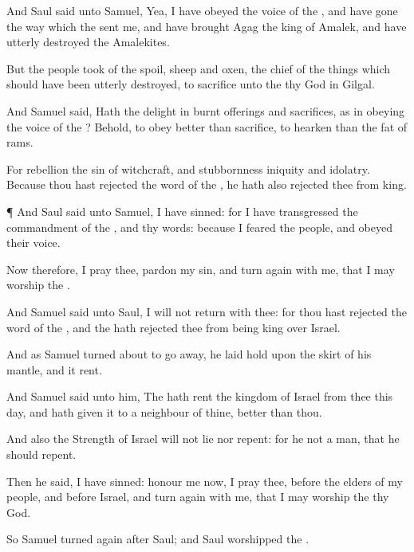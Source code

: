{And
Saul
said unto
Samuel, Yea, I have
obeyed the
voice of the
{}, and have
gone the
way which the
{}
sent me, and have
brought
Agag the
king of
Amalek, and have utterly
destroyed the
Amalekites.

But the
people
took of the
spoil,
sheep and
oxen, the
chief of the things which should have been utterly
destroyed, to
sacrifice unto the
{} thy
God in
Gilgal.

And
Samuel
said, Hath the
{}
{}
delight in burnt
offerings and
sacrifices, as in
obeying the
voice of the
{}? Behold, to
obey
{}
better than
sacrifice,
{} to
hearken than the
fat of
rams.

For
rebellion
{} the
sin of
witchcraft, and
stubbornness
{}
iniquity and
idolatry. Because thou hast
rejected the
word of the
{}, he hath also
rejected thee from
{}
king.


\par }{\PP {}¶ And
Saul
said unto
Samuel, I have
sinned: for I have
transgressed the
commandment of the
{}, and thy
words: because I
feared the
people, and
obeyed their
voice.

Now therefore, I pray thee,
pardon my
sin, and turn
again with me, that I may
worship the
{}.

And
Samuel
said unto
Saul, I will not
return with thee: for thou hast
rejected the
word of the
{}, and the
{} hath
rejected thee from being
king over
Israel.

And as
Samuel turned
about to go
away, he laid
hold upon the
skirt of his
mantle, and it
rent.

And
Samuel
said unto him, The
{} hath
rent the
kingdom of
Israel from thee this
day, and hath
given it to a
neighbour of thine,
{}
better than thou.

And also the
Strength of
Israel will not
lie nor
repent: for he
{} not a
man, that he should
repent.

Then he
said, I have
sinned:
{}
honour me now, I pray thee, before the
elders of my
people, and before
Israel, and turn
again with me, that I may
worship the
{} thy
God.

So
Samuel turned
again
after
Saul; and
Saul
worshipped the
{}.


}
